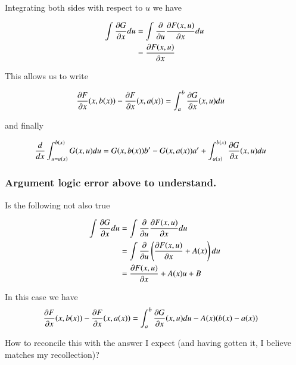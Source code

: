 Integrating both sides with respect to $u$ we have

\begin{align*}
\int \PD{x}{G} du 
&= \int \PD{u}{} \PD{x}{F(x,u)} du \\
&= \PD{x}{F(x,u)} 
\end{align*}

This allows us to write 

\begin{align*}
\PD{x}{F}(x,b(x))
-\PD{x}{F}(x,a(x))
&=
\int_{a}^b \PD{x}{G}(x,u) du
\end{align*}

and finally

\begin{align}\label{eqn:fourier_maxwell:diffInt}
\frac{d}{dx} \int_{u = a(x)}^{b(x)} G(x,u) du
&=
G(x,b(x)) b'
-G(x,a(x)) a'
+ \int_{a(x)}^{b(x)} \PD{x}{G}(x,u) du
\end{align}

\subsubsection{Argument logic error above to understand. }

Is the following not also true

\begin{align*}
\int \PD{x}{G} du 
&= \int \PD{u}{} \PD{x}{F(x,u)} du \\
&= \int \PD{u}{} \left( \PD{x}{F(x,u)} + A(x) \right) du \\
&= \PD{x}{F(x,u)} + A(x)u + B
\end{align*}

In this case we have
\begin{align*}
\PD{x}{F}(x,b(x)) -\PD{x}{F}(x,a(x)) &= \int_{a}^b \PD{x}{G}(x,u) du - A(x) ( b(x) - a(x))
\end{align*}

How to reconcile this with the answer I expect (and having gotten it, I believe matches my recollection)?

